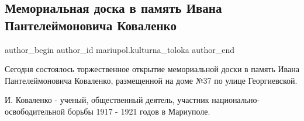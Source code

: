  
 
 
 
 

\subsection{Мемориальная доска в память Ивана Пантелеймоновича Коваленко}
\label{sec:22_01_2019.fb.mariupol.kulturna_toloka.1.memorialnaja_doska_pamjat_ivan_kovalenko}

\ifcmt
 author_begin
   author_id mariupol.kulturna_toloka
 author_end
\fi

\begin{minipage}{0.9\textwidth}
Сегодня состоялось торжественное открытие мемориальной доски в память Ивана
Пантелеймоновича Коваленко, размещенной на доме №37 по улице Георгиевской.

И. Коваленко - ученый, общественный деятель, участник
национально-освободительной борьбы 1917 - 1921 годов в Мариуполе.
\end{minipage}
